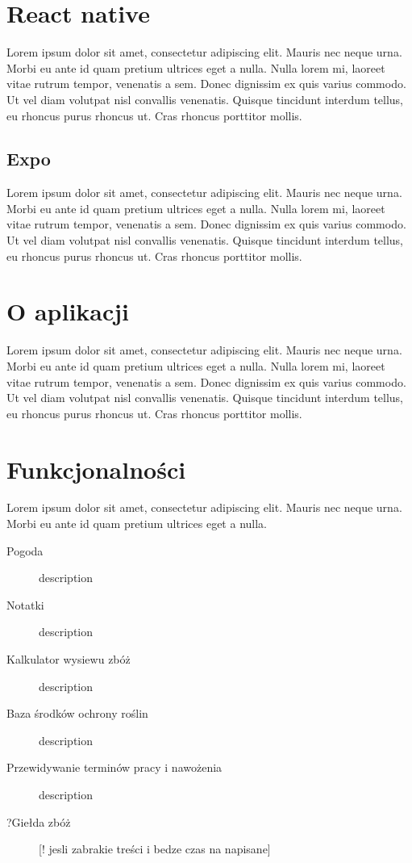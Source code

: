 \documentclass[a4paper,12pt,oneside]{book}
\begin{document}
	\section{React native}
	Lorem ipsum dolor sit amet, consectetur adipiscing elit. Mauris nec neque urna. Morbi eu ante id quam pretium ultrices eget a nulla. Nulla lorem mi, laoreet vitae rutrum tempor, venenatis a sem. Donec dignissim ex quis varius commodo. Ut vel diam volutpat nisl convallis venenatis. Quisque tincidunt interdum tellus, eu rhoncus purus rhoncus ut. Cras rhoncus porttitor mollis.
	
	\subsection{Expo}
	Lorem ipsum dolor sit amet, consectetur adipiscing elit. Mauris nec neque urna. Morbi eu ante id quam pretium ultrices eget a nulla. Nulla lorem mi, laoreet vitae rutrum tempor, venenatis a sem. Donec dignissim ex quis varius commodo. Ut vel diam volutpat nisl convallis venenatis. Quisque tincidunt interdum tellus, eu rhoncus purus rhoncus ut. Cras rhoncus porttitor mollis.
	
	\section{O aplikacji}
	Lorem ipsum dolor sit amet, consectetur adipiscing elit. Mauris nec neque urna. Morbi eu ante id quam pretium ultrices eget a nulla. Nulla lorem mi, laoreet vitae rutrum tempor, venenatis a sem. Donec dignissim ex quis varius commodo. Ut vel diam volutpat nisl convallis venenatis. Quisque tincidunt interdum tellus, eu rhoncus purus rhoncus ut. Cras rhoncus porttitor mollis.
	
	\section{Funkcjonalności}
	Lorem ipsum dolor sit amet, consectetur adipiscing elit. Mauris nec neque urna. Morbi eu ante id quam pretium ultrices eget a nulla.
	\begin{description}
		\item[Pogoda] description
		\item[Notatki] description
		\item[Kalkulator wysiewu zbóż] description
		\item[Baza środków ochrony roślin] description
		\item[Przewidywanie terminów pracy i nawożenia] description
		\item[?Giełda zbóż] [! jesli zabrakie treści i bedze czas na napisane]
	\end{description}
	
\end{document}
